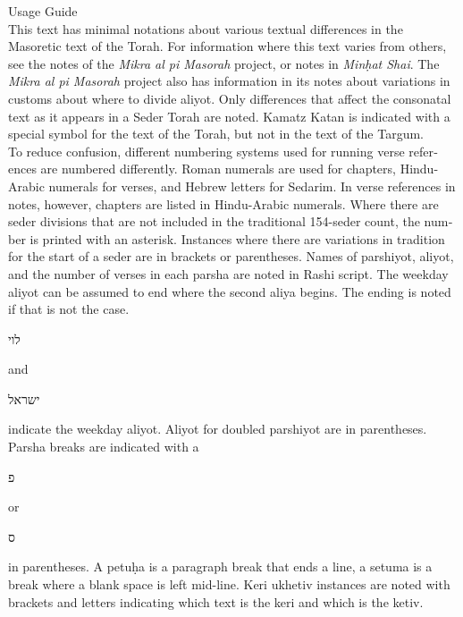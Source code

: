 \clearpage
{}	
\begin{minipage}{\textwidth}\englishfont
	
	\begin{english}
		\vspace{16pt}
		\Large Usage Guide\vspace{12pt}\\
		\normalsize
		This text has minimal notations about various textual differences in the Masoretic text of the Torah. For information where this text varies from others, see the notes of the \textit{Mikra al pi Masorah} project, or notes in \textit{Min\d{h}at Shai}. The \textit{Mikra al pi Masorah} project also has information in its notes about variations in customs about where to divide aliyot. Only differences that affect the consonatal text as it appears in a Seder Torah are noted. Kamatz Katan is indicated with a special symbol for the text of the Torah, but not in the text of the Targum.\\
		
		To reduce confusion, different numbering systems used for running verse references are numbered differently. Roman numerals are used for chapters, Hindu-Arabic numerals for verses, and Hebrew letters for Sedarim. In verse references in notes, however, chapters are listed in Hindu-Arabic numerals. Where there are seder divisions that are not included in the traditional 154-seder count, the number is printed with an asterisk. Instances where there are variations in tradition for the start of a seder are in brackets or parentheses. Names of parshiyot, aliyot, and the number of verses in each parsha are noted in Rashi script. The weekday aliyot can be assumed to end where the second aliya begins. The ending is noted if that is not the case.   \begin{hebrew}לוי\end{hebrew} and  \begin{hebrew}ישראל\end{hebrew} indicate the weekday aliyot. Aliyot for doubled parshiyot are in parentheses.\\
		
		Parsha breaks are indicated with a \begin{hebrew}פ\end{hebrew} or \begin{hebrew}ס\end{hebrew} in parentheses. A petu\d{h}a is a paragraph break that ends a line, a setuma is a break where a blank space is left mid-line. Keri ukhetiv instances are noted with brackets and letters indicating which text is the keri and which is the ketiv.
		
	\end{english}
	
\end{minipage}


